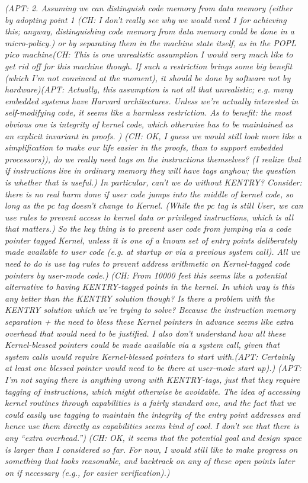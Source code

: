 \documentclass{article}
\newcommand{\ch}[1]{{\color{dkblue}\em (CH: #1)}}
\newcommand{\apt}[1]{{\color{red}\em (APT: #1)}}
\newcommand*{\EG}{e.g.,\xspace}
\begin{document}
\apt{
2. Assuming we can distinguish code memory from data memory (either by adopting
point 1 \ch{I don't really see why we would need 1 for achieving this;
  anyway, distinguishing code memory from data memory could be done in
  a micro-policy.}
or by separating them in the machine state itself, as in the POPL pico 
machine\ch{This is one unrealistic assumption I would very much like to get
  rid off for this machine though.  
  If such a restriction brings some big
  benefit (which I'm not convinced at the moment), it should be
  done by software not by hardware}\apt{Actually, this assumption is not all 
  that unrealistic; e.g. many embedded systems have Harvard architectures. 
  Unless we're actually interested in self-modifying code, it seems like a harmless 
  restriction. As to benefit: the most obvious one is integrity of kernel code, which 
  otherwise has to be maintained as an explicit invariant in proofs. }
  \ch{OK, I guess we would still look more like a simplification to make
    our life easier in the proofs, than to support embedded processors}),
do we really need tags on the instructions themselves? (I realize that
if instructions live in ordinary memory they will have tags anyhow; the question
is whether that is useful.)  In particular, can't we do without KENTRY?
Consider: there is no real harm done if user code jumps
into the middle of kernel code, so long as the pc tag doesn't change to Kernel.
(While the pc tag is still User, we can use rules to prevent access to kernel
data or privileged instructions, which is all that matters.)
So the key thing is to prevent user code from jumping via a code pointer tagged Kernel, 
unless it is one of a known set of entry points deliberately made available to user code
(e.g. at startup or via a previous system call).  All we need to do is use
tag rules to prevent address arithmetic on Kernel-tagged code pointers by
user-mode code.}
\ch{From 10000 feet this seems like a potential alternative to having
  KENTRY-tagged points in the kernel. In which way is this any better
  than the KENTRY solution though? Is there a problem with the KENTRY
  solution which we're trying to solve? Because the instruction memory
  separation + the need to bless these Kernel pointers in advance
  seems like extra overhead that would need to be justified. I also
  don't understand how all these Kernel-blessed pointers could be made
  available via a system call, given that system calls would require
  Kernel-blessed pointers to start with.\apt{Certainly at least one blessed pointer
  would need to be there at user-mode start up}.} 
\apt{I'm not saying there is anything wrong with KENTRY-tags, just that they require 
  tagging of instructions, which might otherwise be avoidable.  
  The idea of accessing kernel routines through capabilities is a fairly
  standard one, and the fact that we could easily use tagging to maintain
  the integrity of the entry point addresses and hence use them directly 
  as capabilities seems kind of cool. I don't see that there is any ``extra overhead.''}
\ch{OK, it seems that the potential goal and design space is larger
  than I considered so far. For now, I would still like to make
  progress on something that looks reasonable, and backtrack on any of
  these open points later on if necessary (\EG for easier
  verification).}
\end{document}
